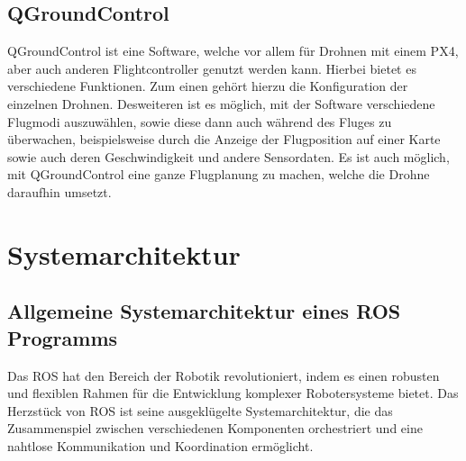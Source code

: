 \subsection{QGroundControl}  \label{qGroundControl:subsection}
QGroundControl ist eine Software, welche vor allem für Drohnen mit einem PX4, aber auch anderen Flightcontroller genutzt werden kann. Hierbei bietet es verschiedene Funktionen. Zum einen gehört hierzu die Konfiguration der einzelnen  Drohnen. Desweiteren ist es möglich, mit der Software verschiedene Flugmodi auszuwählen, sowie diese dann auch während des Fluges zu überwachen, beispielsweise durch die Anzeige der Flugposition auf einer Karte sowie auch deren Geschwindigkeit und andere Sensordaten.
Es ist auch möglich, mit QGroundControl eine ganze Flugplanung zu machen, welche die Drohne daraufhin umsetzt. \cite[vgl.][]{qGroundControl}


\section{Systemarchitektur}\label{systemarchitektur:section}

\subsection{Allgemeine Systemarchitektur eines ROS Programms} \label{systemarchitektur_ros_programm:subsection}
Das \ac{ROS} hat den Bereich der Robotik revolutioniert, indem es einen robusten und flexiblen Rahmen für die Entwicklung komplexer Robotersysteme bietet. Das Herzstück von \ac{ROS} ist seine ausgeklügelte Systemarchitektur, die das Zusammenspiel zwischen verschiedenen Komponenten orchestriert und eine nahtlose Kommunikation und Koordination ermöglicht.

